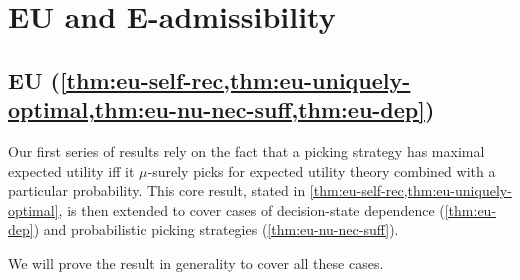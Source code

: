 \documentclass[a4paper,final]{article}
\newtheorem{theorem}{Theorem}[section]
\newcommand\A{\mathcal{A}}
\newcommand\Exp{\mathsf{Exp}}
\newcommand\EU{\mathrm{EU}}
\newcommand\U{\mathfrak{U}} %
\newcommand{\D}{\mathcal{D}}
\newcommand{\n}{\mathsf{n}}
\renewcommand{\nu}{\n}
\DeclarePairedDelimiter\abs{\lvert}{\rvert}%
\newcommand*\diff{\mathop{}\!\mathrm{d}}
\renewcommand{\leq}{\leqslant}
\renewcommand{\geq}{\geqslant}
\newenvironment{CCM rewritten}
{\begingroup\color{blue}} %
{\endgroup}              %
\begin{document}
\section{EU and E-admissibility}

	
\subsection{EU (\cref{thm:eu-self-rec,thm:eu-uniquely-optimal,thm:eu-nu-nec-suff,thm:eu-dep})}\label{sect:EU-appendix}
Our first series of results rely on the fact that a picking strategy has maximal expected utility iff it $\mu$-surely picks for expected utility theory combined with a particular probability. This core result, stated in \cref{thm:eu-self-rec,thm:eu-uniquely-optimal}, is then extended to cover cases of decision-state dependence (\cref{thm:eu-dep}) and probabilistic picking strategies (\cref{thm:eu-nu-nec-suff}). 

We will prove the result in generality to cover all these cases. 

%
%	
%	
%
%
\end{document}
